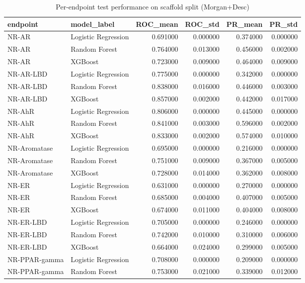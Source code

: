 \begin{table}
\caption{Per-endpoint test performance on scaffold split (Morgan+Desc)}
\label{tab:endpoint_results_scaffold}
\begin{tabular}{llrrrr}
\toprule
endpoint & model_label & ROC_mean & ROC_std & PR_mean & PR_std \\
\midrule
NR-AR & Logistic Regression & 0.691000 & 0.000000 & 0.374000 & 0.000000 \\
NR-AR & Random Forest & 0.764000 & 0.013000 & 0.456000 & 0.002000 \\
NR-AR & XGBoost & 0.723000 & 0.009000 & 0.464000 & 0.009000 \\
NR-AR-LBD & Logistic Regression & 0.775000 & 0.000000 & 0.342000 & 0.000000 \\
NR-AR-LBD & Random Forest & 0.838000 & 0.016000 & 0.446000 & 0.003000 \\
NR-AR-LBD & XGBoost & 0.857000 & 0.002000 & 0.442000 & 0.017000 \\
NR-AhR & Logistic Regression & 0.806000 & 0.000000 & 0.445000 & 0.000000 \\
NR-AhR & Random Forest & 0.841000 & 0.003000 & 0.596000 & 0.002000 \\
NR-AhR & XGBoost & 0.833000 & 0.002000 & 0.574000 & 0.010000 \\
NR-Aromatase & Logistic Regression & 0.695000 & 0.000000 & 0.216000 & 0.000000 \\
NR-Aromatase & Random Forest & 0.751000 & 0.009000 & 0.367000 & 0.005000 \\
NR-Aromatase & XGBoost & 0.728000 & 0.014000 & 0.362000 & 0.008000 \\
NR-ER & Logistic Regression & 0.631000 & 0.000000 & 0.270000 & 0.000000 \\
NR-ER & Random Forest & 0.685000 & 0.004000 & 0.407000 & 0.005000 \\
NR-ER & XGBoost & 0.674000 & 0.011000 & 0.404000 & 0.008000 \\
NR-ER-LBD & Logistic Regression & 0.705000 & 0.000000 & 0.246000 & 0.000000 \\
NR-ER-LBD & Random Forest & 0.742000 & 0.010000 & 0.310000 & 0.006000 \\
NR-ER-LBD & XGBoost & 0.664000 & 0.024000 & 0.299000 & 0.005000 \\
NR-PPAR-gamma & Logistic Regression & 0.708000 & 0.000000 & 0.209000 & 0.000000 \\
NR-PPAR-gamma & Random Forest & 0.753000 & 0.021000 & 0.339000 & 0.012000 \\

\end{tabular}
\end{table}
